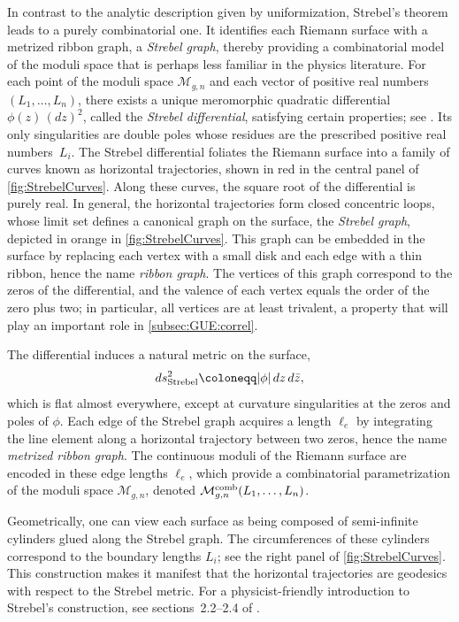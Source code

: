 \documentclass[a4paper,11pt,english]{article}
\theoremstyle{plain}
\theoremstyle{definition}
\theoremstyle{plain}
\newcommand{\M}{\mathcal{M}}
\begin{document}
In contrast to the analytic description given by uniformization, Strebel's theorem leads to a purely combinatorial one. It identifies each Riemann surface with a metrized ribbon graph, a \emph{Strebel graph}, thereby providing a combinatorial model of the moduli space that is perhaps less familiar in the physics literature. For each point of the moduli space $\mathcal{M}_{g,n}$ and each vector of positive real numbers $(L_1, \ldots, L_n)$, there exists a unique meromorphic quadratic differential $\phi(z)\,(dz)^2$, called the \emph{Strebel differential}, satisfying certain properties; see \cite{Str84, MP98, Muk03}. Its only singularities are double poles whose residues are the prescribed positive real numbers~$L_i$. The Strebel differential foliates the Riemann surface into a family of curves known as horizontal trajectories, shown in red in the central panel of \cref{fig:StrebelCurves}. Along these curves, the square root of the differential is purely real. In general, the horizontal trajectories form closed concentric loops, whose limit set defines a canonical graph on the surface, the \emph{Strebel graph}, depicted in orange in \cref{fig:StrebelCurves}. This graph can be embedded in the surface by replacing each vertex with a small disk and each edge with a thin ribbon, hence the name \emph{ribbon graph}. The vertices of this graph correspond to the zeros of the differential, and the valence of each vertex equals the order of the zero plus two; in particular, all vertices are at least trivalent, a property that will play an important role in \cref{subsec:GUE:correl}.

The differential induces a natural metric on the surface,
\begin{equation}
    ds^2_{\textup{Strebel}} \coloneqq |\phi| \, dz\, d\bar{z},
\end{equation}
which is flat almost everywhere, except at curvature singularities at the zeros and poles of $\phi$. Each edge of the Strebel graph acquires a length $\ell_e$ by integrating the line element along a horizontal trajectory between two zeros, hence the name \emph{metrized ribbon graph}. The continuous moduli of the Riemann surface are encoded in these edge lengths $\ell_e$, which provide a combinatorial parametrization of the moduli space $\M_{g,n}$, denoted $\mathcal{M}_{g,n}^{\textup{comb}}(L_1,\ldots,L_n)$.

Geometrically, one can view each surface as being composed of semi-infinite cylinders glued along the Strebel graph. The circumferences of these cylinders correspond to the boundary lengths $L_i$; see the right panel of \cref{fig:StrebelCurves}. This construction makes it manifest that the horizontal trajectories are geodesics with respect to the Strebel metric. For a physicist-friendly introduction to Strebel's construction, see sections~2.2--2.4 of \cite{GKKMS}.
\end{document}
